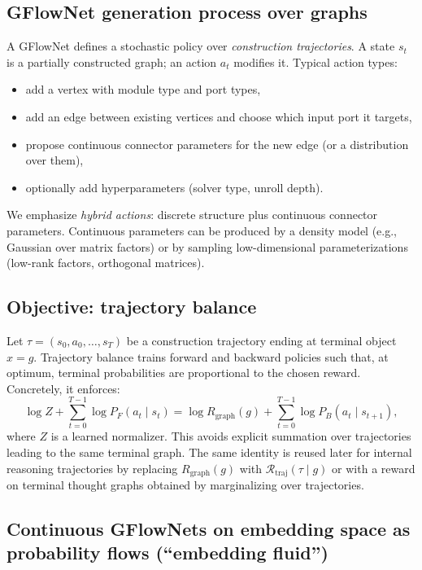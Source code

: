 \documentclass[11pt]{article}
\theoremstyle{definition}
\theoremstyle{plain}
\theoremstyle{remark}
\newcommand{\mc}[1]{\mathcal{#1}}
\newcommand{\Reward}{\mc{R}}
\begin{document}
\subsection{GFlowNet generation process over graphs}
A GFlowNet defines a stochastic policy over \emph{construction trajectories}.
A state $s_t$ is a partially constructed graph; an action $a_t$ modifies it.
Typical action types:
\begin{itemize}[leftmargin=2em]
\item add a vertex with module type and port types,
\item add an edge between existing vertices and choose which input port it targets,
\item propose continuous connector parameters for the new edge (or a distribution over them),
\item optionally add hyperparameters (solver type, unroll depth).
\end{itemize}

We emphasize \emph{hybrid actions}: discrete structure plus continuous connector parameters.
Continuous parameters can be produced by a density model (e.g., Gaussian over matrix factors) or by sampling low-dimensional parameterizations (low-rank factors, orthogonal matrices).

\subsection{Objective: trajectory balance}
Let $\tau=(s_0,a_0,\dots,s_T)$ be a construction trajectory ending at terminal object $x=g$.
Trajectory balance trains forward and backward policies such that, at optimum, terminal probabilities are proportional to the chosen reward.
Concretely, it enforces:
\[
\log Z + \sum_{t=0}^{T-1} \log P_F(a_t\mid s_t)
=
\log R_{\mathrm{graph}}(g) + \sum_{t=0}^{T-1} \log P_B(a_t\mid s_{t+1}),
\]
where $Z$ is a learned normalizer.
This avoids explicit summation over trajectories leading to the same terminal graph.
The same identity is reused later for internal reasoning trajectories by replacing $R_{\mathrm{graph}}(g)$ with $\Reward_{\mathrm{traj}}(\tau\mid g)$ or with a reward on terminal thought graphs obtained by marginalizing over trajectories.

\subsection{Continuous GFlowNets on embedding space as probability flows (``embedding fluid'')}
\label{sec:fluid}
\end{document}
